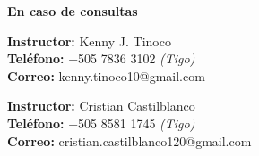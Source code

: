 \vspace*{\fill}
\begin{flushright}
    \textbf{\large En caso de consultas}

    \textbf{Instructor:} Kenny J. Tinoco \\
    \textbf{Teléfono:} +505 7836 3102 \emph{(Tigo)} \\
    \textbf{Correo:} kenny.tinoco10@gmail.com

    \textbf{Instructor:} Cristian Castilblanco\\
    \textbf{Teléfono:} +505 8581 1745 \emph{(Tigo)}\\
    \textbf{Correo:} cristian.castilblanco120@gmail.com

\end{flushright}
\vspace*{0cm}